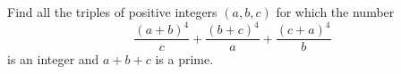 Find all the triples of positive integers $(a,b,c)$ for which the number\[\frac{(a+b)^4}{c}+\frac{(b+c)^4}{a}+\frac{(c+a)^4}{b}\]is an integer and $a+b+c$ is a prime.